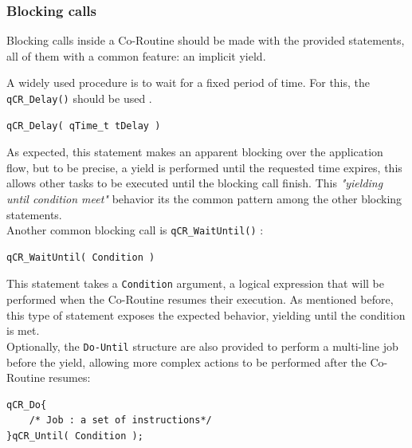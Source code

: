 \documentclass{article}
\begin{document}
\subsubsection{Blocking calls}
Blocking calls inside a Co-Routine should be made with the provided statements, all of them with a common feature: an implicit yield.

A widely used procedure is to wait for a fixed period of time. For this, the \lstinline{qCR_Delay()} should be used . 

\begin{lstlisting}[style=CStyle]
qCR_Delay( qTime_t tDelay ) 
\end{lstlisting}

As expected, this statement makes an apparent blocking over the application flow, but to be precise, a yield is performed until the requested time expires, this allows other tasks to be executed until the blocking call finish. This \textit{"yielding until condition meet"} behavior its the common pattern among the other blocking statements. \\

Another common blocking call is \lstinline{qCR_WaitUntil()} :

\begin{lstlisting}[style=CStyle]
qCR_WaitUntil( Condition ) 
\end{lstlisting}

This statement takes a \lstinline{Condition} argument, a logical expression that will be performed when the Co-Routine resumes their execution. As mentioned before, this type of statement exposes the expected behavior, yielding until the condition is met. \\


Optionally, the \lstinline{Do-Until}   structure are also provided to perform a multi-line job before the yield, allowing more complex actions to be performed after the Co-Routine  resumes: \\

\begin{lstlisting}[style=CStyle]
qCR_Do{
    /* Job : a set of instructions*/
}qCR_Until( Condition );
\end{lstlisting}
\end{document}
